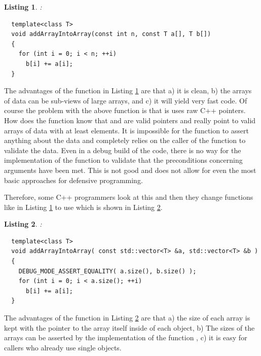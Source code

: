 \documentclass[pdf,ps2pdf,11pt]{SANDreport}
\newtheorem{listing}{Listing}
\begin{document}
\begin{listing}:\\
\label{listing:addArrayIntoArray-raw}
{\small\begin{verbatim}
  template<class T>
  void addArrayIntoArray(const int n, const T a[], T b[])
  {
    for (int i = 0; i < n; ++i)
      b[i] += a[i];
  }
\end{verbatim}}
\end{listing}

The advantages of the function in Listing
{}\ref{listing:addArrayIntoArray-raw} are that a) it is clean, b) the
arrays of data can be sub-views of large arrays, and c) it will yield
very fast code.  Of course the problem with the above function
{} is that is uses raw C++ pointers.  How
does the function {} know that
{} and {} are valid pointers and really point to
valid arrays of data with at least {} elements.  It is
impossible for the function {} to
assert anything about the data and completely relies on the caller of
the function to validate the data.  Even in a debug build of the code,
there is no way for the implementation of the function
{} to validate that the preconditions
concerning arguments have been met.  This is not good and does not
allow for even the most basic approaches for defensive programming.

Therefore, some C++ programmers look at this and then they change
functions like {} in Listing
{}\ref{listing:addArrayIntoArray-raw} to use {}
which is shown in Listing
{}\ref{listing:addArrayIntoArray-std-vector}.

\begin{listing}:\\
\label{listing:addArrayIntoArray-std-vector}
{\small\begin{verbatim}
  template<class T>
  void addArrayIntoArray( const std::vector<T> &a, std::vector<T> &b )
  {
    DEBUG_MODE_ASSERT_EQUALITY( a.size(), b.size() );
    for (int i = 0; i < a.size(); ++i)
      b[i] += a[i];
  }
\end{verbatim}}
\end{listing}

The advantages of the function in Listing
{}\ref{listing:addArrayIntoArray-std-vector} are that a) the size of
each array is kept with the pointer to the array itself inside of each
{} object, b) The sizes of the arrays can be
asserted by the implementation of the function
{}, c) it is easy for callers who
already use single {} objects.
\end{document}
